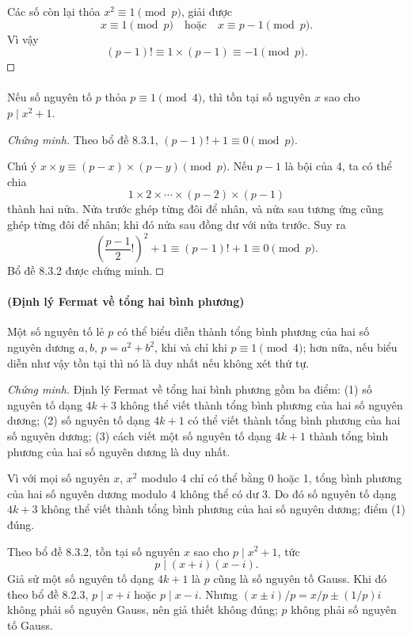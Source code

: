 \documentclass[11pt]{article}
\newcommand{\square}{\mathord{\vcenter{\hrule height .5pt
  \hbox{\vrule width .5pt height 5pt\kern5pt\vrule width .5pt}
  \hrule height .5pt}}}
\begin{document}
Các số còn lại thỏa \(x^2\equiv1\pmod p\), giải được
\[
  x\equiv1\pmod p\quad\text{hoặc}\quad x\equiv p-1\pmod p.
\]
Vì vậy
\[
  (p-1)!\equiv1\times(p-1)\equiv-1\pmod p.
\]
\(\square\)

\paragraph{}
Nếu số nguyên tố \(p\) thỏa \(p\equiv1\pmod4\), thì tồn tại số nguyên \(x\)
sao cho \(p\mid x^2+1\).

\emph{Chứng minh.}
Theo bổ đề 8.3.1, \((p-1)!+1\equiv0\pmod p\).

Chú ý \(x\times y\equiv(p-x)\times(p-y)\pmod p\). Nếu \(p-1\) là bội của 4,
ta có thể chia
\[
  1\times2\times\cdots\times(p-2)\times(p-1)
\]
thành hai nửa. Nửa trước ghép từng đôi để nhân, và nửa sau tương ứng cũng ghép
từng đôi để nhân; khi đó nửa sau đồng dư với nửa trước. Suy ra
\[
  \left(\frac{p-1}{2}!\right)^2+1\equiv (p-1)!+1\equiv0\pmod p.
\]
Bổ đề 8.3.2 được chứng minh. \(\square\)

\paragraph{ (Định lý Fermat về tổng hai bình phương)}
Một số nguyên tố lẻ \(p\) có thể biểu diễn thành tổng bình phương của hai số
nguyên dương \(a,b\), \(p=a^2+b^2\), khi và chỉ khi \(p\equiv1\pmod4\); hơn
nữa, nếu biểu diễn như vậy tồn tại thì nó là duy nhất nếu không xét thứ tự.

\emph{Chứng minh.}
Định lý Fermat về tổng hai bình phương gồm ba điểm: (1) số nguyên tố dạng
\(4k+3\) không thể viết thành tổng bình phương của hai số nguyên dương; (2) số
nguyên tố dạng \(4k+1\) có thể viết thành tổng bình phương của hai số nguyên
dương; (3) cách viết một số nguyên tố dạng \(4k+1\) thành tổng bình phương của
hai số nguyên dương là duy nhất.

Vì với mọi số nguyên \(x\), \(x^2\) modulo 4 chỉ có thể bằng 0 hoặc 1, tổng
bình phương của hai số nguyên dương modulo 4 không thể có dư 3. Do đó số
nguyên tố dạng \(4k+3\) không thể viết thành tổng bình phương của hai số nguyên
dương; điểm (1) đúng.

Theo bổ đề 8.3.2, tồn tại số nguyên \(x\) sao cho \(p\mid x^2+1\), tức
\[
  p\mid(x+i)(x-i).
\]
Giả sử một số nguyên tố dạng \(4k+1\) là \(p\) cũng là số nguyên tố Gauss. Khi
đó theo bổ đề 8.2.3, \(p\mid x+i\) hoặc \(p\mid x-i\). Nhưng
\((x\pm i)/p=x/p\pm(1/p)i\) không phải số nguyên Gauss, nên giả thiết không
đúng; \(p\) không phải số nguyên tố Gauss.
\end{document}
